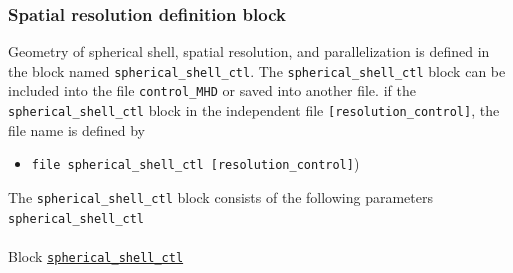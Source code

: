 \subsubsection{Spatial resolution definition block}
\label{section:resolution_block}

Geometry of spherical shell, spatial resolution, and parallelization is defined in the block named \verb|spherical_shell_ctl|. The \verb|spherical_shell_ctl| block can be included into the file {\tt control\_MHD} or saved into another file.  if the \verb|spherical_shell_ctl| block in the independent file {\tt [resolution\_control]}, the file name is defined by
%
\begin{itemize}
\item {\tt   file    spherical\_shell\_ctl        [resolution\_control]})
\end{itemize}
The \verb|spherical_shell_ctl| block consists of the following parameters
%
\verb|spherical_shell_ctl|
\label{href_i:spherical_shell_ctl}
\\
\\
%
Block \hyperref[href_t:spherical_shell_ctl]{\tt spherical\_shell\_ctl}
%

